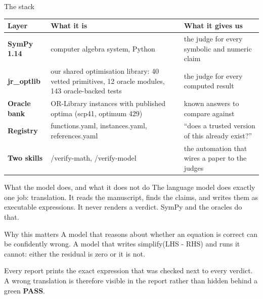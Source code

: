 \documentclass[aspectratio=169,11pt]{beamer}
\newcommand{\code}[1]{{\ttfamily\small #1}}
\newcommand{\PASS}{{\color{okgreen}\bfseries PASS}}
\begin{document}
\begin{frame}{The stack}
  \vfill
  \begin{center}
  {\small
  \begin{tabular}{@{}p{}p{}p{}@{}}
    \toprule
    \textbf{Layer} & \textbf{What it is} & \textbf{What it gives us} \\
    \midrule
    \textbf{SymPy 1.14} & computer algebra system, Python & the judge for every symbolic and
    numeric claim \\[0.4em]
    \textbf{jr\_optlib} & our shared optimisation library: 40 vetted primitives, 12 oracle
    modules, 143 oracle-backed tests & the judge for every computed result \\[0.4em]
    \textbf{Oracle bank} & OR-Library instances with published optima (\code{scp41}, optimum 429) &
    known answers to compare against \\[0.4em]
    \textbf{Registry} & \code{functions.yaml}, \code{instances.yaml}, \code{references.yaml} &
    ``does a trusted version of this already exist?'' \\[0.4em]
    \textbf{Two skills} & \code{/verify-math}, \code{/verify-model} & the automation that wires a
    paper to the judges \\
    \bottomrule
  \end{tabular}}
  \end{center}
  \vfill
\end{frame}

\begin{frame}{What the model does, and what it does not do}
  The language model does exactly one job: \alert{translation}. It reads the manuscript, finds the
  claims, and writes them as executable expressions.
  \vfill
  It never renders a verdict. SymPy and the oracles do that.
  \vfill
  \begin{block}{Why this matters}
    A model that reasons about whether an equation is correct can be confidently wrong. A model that
    writes \code{simplify(LHS - RHS)} and runs it cannot: either the residual is zero or it is not.
  \end{block}
  \vfill
  Every report prints \alert{the exact expression that was checked} next to every verdict. A wrong
  translation is therefore visible in the report rather than hidden behind a green \PASS.
\end{frame}
\end{document}
